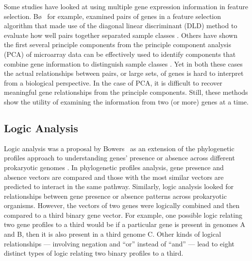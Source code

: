 {%
Some studies have looked at using multiple gene expression information in
feature selection.  B{\o} \ea\, for example, examined pairs of genes in a
feature selection algorithm that made use of the diagonal linear discriminant
(DLD) method to evaluate how well pairs together separated sample classes
\cite{PMID_11983058}.  Others have shown the first several principle components
from the principle component analysis (PCA) of microarray data can be
effectively used to identify components that combine gene information to
distinguish sample classes \cite{PMID_173481048,PMID_11126130,PMID_10963673}.
Yet in both these cases the actual relationships between pairs, or large sets,
of genes is hard to interpret from a biological perspective. In the case of
PCA, it is difficult to recover meaningful gene relationships from the
principle components.  Still, these methods show the utility of examining the
information from two (or more) genes at a time.

\subsection{Logic Analysis}

Logic analysis was a proposal by Bowers \ea\ as an extension of
the phylogenetic profiles approach to understanding genes' presence or absence
across different prokaryotic genomes \cite{PMID_144923264,pellegrini1999apf}.
In phylogenetic profiles analysis, gene presence and absence vectors are compared and
those with the most similar vectors are predicted to interact in the same
pathway.  Similarly, logic analysis looked for relationships between gene
presence or absence patterns across prokaryotic organisms. However, the vectors of two
genes were logically combined and then compared to a third binary gene vector.
For example, one possible logic relating two gene profiles to a third would be
if a particular gene is present in genomes A and B, then it is also present in a
third genome C.  Other kinds of logical relationships --- involving negation
and ``or'' instead of ``and'' --- lead to eight distinct types of logic relating
two binary profiles to a third.

}

